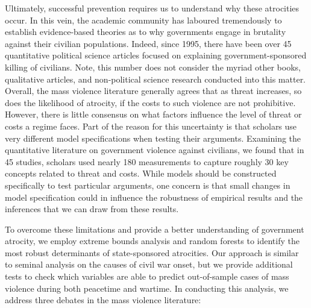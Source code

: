 Ultimately, successful prevention requires us to understand why these atrocities occur. In this vein, the academic community has laboured tremendously to establish evidence-based theories as to why governments engage in brutality against their civilian populations. Indeed, since 1995, there have been over 45 quantitative political science articles focused on explaining government-sponsored killing of civilians. Note, this number does not consider the myriad other books, qualitative articles, and non-political science research conducted into this matter. Overall, the mass violence literature generally agrees that as threat increases, so does the likelihood of atrocity, if the costs to such violence are not prohibitive. However, there is little consensus on what factors influence the level of threat or costs a regime faces. Part of the reason for this uncertainty is that scholars use very different model specifications when testing their arguments. Examining the quantitative literature on government violence against civilians, we found that in 45 studies, scholars used nearly 180 measurements to capture roughly 30 key concepts related to threat and costs. While models should be constructed specifically to test particular arguments, one concern is that small changes in model specification could in influence the robustness of empirical results and the inferences that we can draw from these results.

To overcome these limitations and provide a better understanding of government atrocity, we employ extreme bounds analysis and random forests to identify the most robust determinants of state-sponsored atrocities. Our approach is similar to \cite{hegre2006sensitivity} seminal analysis on the causes of civil war onset, but we provide additional tests to check which variables are able to predict out-of-sample cases of mass violence during both peacetime and wartime. In conducting this analysis, we address three debates in the mass violence literature:

